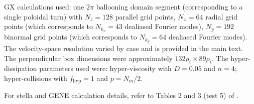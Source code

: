 \documentclass{jpp}
\newcommand{\GX}{{GX}\xspace}
\begin{document}
\GX calculations used: one $2\pi$ ballooning domain segment (corresponding to a single poloidal turn) with $N_z=128$ parallel grid points, $N_x=64$ radial grid points (which corresponds to $N_{k_x}=43$ dealiased Fourier modes), $N_y=192$ binormal grid points (which corresponds to $N_{k_y}=64$ dealiased Fourier modes). The velocity-space resolution varied by case and is provided in the main text. The perpendicular box dimensions were approximately $132\rho_i\times 89\rho_i$. The hyper-dissipation parameters used were: hyper-viscosity with $D=0.05$ and $n=4$; hyper-collisions with $f_\mathrm{hyp}=1$ and $p=N_m/2$.

For stella and GENE calculation details, refer to Tables 2 and 3 (test 5) of \citet{Gonzalez-Jerez2022}.




\end{document}
